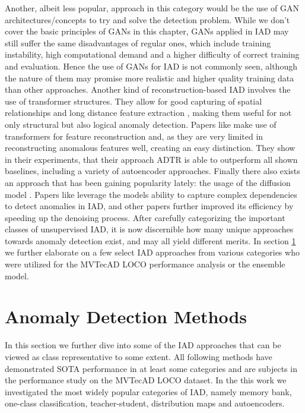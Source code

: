 Another, albeit less popular, approach in this category would be the use of GAN architectures/concepts to try and solve the detection problem. While we don't cover the basic principles of GANs in 
this chapter, GANs applied in IAD may still suffer the same disadvantages of regular ones, which include training instability, high computational demand and a higher difficulty of correct training and 
evaluation. Hence the use of GANs for IAD is not commonly seen, although the nature of them may promise more realistic and higher quality training data than other approaches.
Another kind of reconstruction-based IAD involves the use of transformer structures. They allow for good capturing of spatial relationships and long distance feature extraction \cite{xie2020benchmarking},
making them useful for not only structural but also logical anomaly detection. Papers like \cite{You_2023transformer} make use of transformers for feature reconstruction and, as they are very 
limited in reconstructing anomalous features well, creating an easy distinction. They show in their experiments, that their approach ADTR is able to outperform all shown baselines, including 
a variety of autoencoder approaches.
Finally there also exists an approach that has been gaining popularity lately: the usage of the diffusion model \cite{ho2020denoisingdiffusionOG}. Papers like \cite{Wyatt_2022diffusionfirstapproach} 
leverage the models ability to capture complex dependencies to detect anomalies in IAD, and other papers \cite{zhang2023diffusionaddiffusionmodern} further improved its efficiency by speeding up 
the denoising process.
\newline
After carefully categorizing the important classes of unsupervised IAD, it is now discernible how many unique approaches towards anomaly detection exist, and may all yield different merits. 
In section \ref{sec:IADmethods} we further elaborate on a few select IAD approaches from various categories who were utilized for the MVTecAD LOCO performance analysis or the ensemble 
model. 


\section{Anomaly Detection Methods}
\label{sec:IADmethods}
In this section we further dive into some of the IAD approaches that can be viewed as class representative to some extent. All following methods have demonstrated SOTA performance in 
at least some categories and are subjects in the performance study on the MVTecAD LOCO dataset. In the this work we investigated the most widely popular categories of 
IAD, namely memory bank, one-class classification, teacher-student, distribution maps and autoencoders.%

